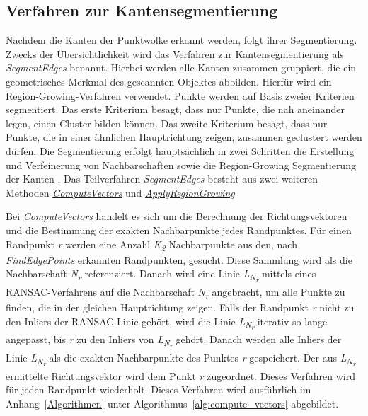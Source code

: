 \subsection{Verfahren zur Kantensegmentierung} \label{edge_segmentation}
Nachdem die Kanten der Punktwolke erkannt werden, folgt ihrer Segmentierung. Zwecks der Übersichtlichkeit wird das Verfahren zur Kantensegmentierung als \textit{SegmentEdges} benannt. Hierbei werden alle Kanten zusammen gruppiert, die ein geometrisches Merkmal des gescannten Objektes abbilden. Hierfür wird ein Region-Growing-Verfahren verwendet. Punkte werden auf Basis zweier Kriterien segmentiert. Das erste Kriterium besagt, dass nur Punkte, die nah aneinander legen, einen Cluster bilden können. Das zweite Kriterium besagt, dass nur Punkte, die in einer ähnlichen Hauptrichtung zeigen, zusammen geclustert werden dürfen. Die Segmentierung erfolgt hauptsächlich in zwei Schritten \textendash{} die Erstellung und Verfeinerung von Nachbarschaften sowie die Region-Growing Segmentierung der Kanten \autocite{ni_edge_2016}. Das Teilverfahren \textit{SegmentEdges} besteht aus zwei weiteren Methoden \textendash{} \textit{\hyperref[alg:compute_vectors]{ComputeVectors}} und \textit{\hyperref[alg:apply_region_growing]{ApplyRegionGrowing}}

Bei \textit{\hyperref[alg:compute_vectors]{ComputeVectors}} handelt es sich um die Berechnung der Richtungsvektoren und die Bestimmung der exakten Nachbarpunkte jedes Randpunktes. Für einen Randpunkt \textit{r} werden eine Anzahl \textit{K\textsubscript{2}} Nachbarpunkte aus den, nach \textit{\hyperref[alg:find_edge_points]{FindEdgePoints}} erkannten Randpunkten, gesucht. Diese Sammlung wird als die Nachbarschaft \textit{N\textsubscript{r}} referenziert. Danach wird eine Linie \textit{L\textsubscript{N\textsubscript{r}}} mittels eines RANSAC-Verfahrens auf die Nachbarschaft \textit{N\textsubscript{r}} angebracht, um alle Punkte zu finden, die in der gleichen Hauptrichtung zeigen. Falls der Randpunkt \textit{r} nicht zu den Inliers der RANSAC-Linie gehört, wird die Linie \textit{L\textsubscript{N\textsubscript{r}}} iterativ so lange angepasst, bis \textit{r} zu den Inliers von \textit{L\textsubscript{N\textsubscript{r}}} gehört. Danach werden alle Inliers der Linie \textit{L\textsubscript{N\textsubscript{r}}} als die exakten Nachbarpunkte des Punktes \textit{r} gespeichert. Der aus \textit{L\textsubscript{N\textsubscript{r}}} ermittelte Richtungsvektor wird dem Punkt \textit{r} zugeordnet. Dieses Verfahren wird für jeden Randpunkt wiederholt. Dieses Verfahren wird ausführlich im Anhang~\ref{Algorithmen} unter Algorithmus~\ref{alg:compute_vectors} abgebildet.

